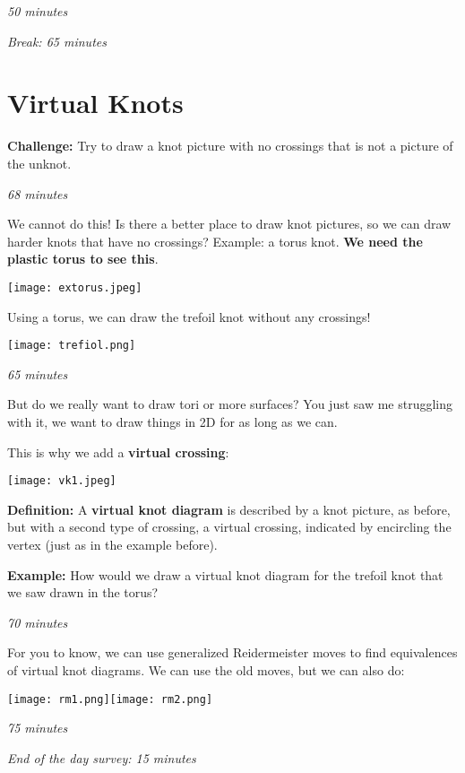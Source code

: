 \documentclass[12pt,letterpaper]{article}
\begin{document}
	\textit{50 minutes}
	
	\textit{Break: 65 minutes}
	
	\section{Virtual Knots}
	
	\textbf{Challenge:} Try to draw a knot picture with no crossings that is not a picture of the unknot.
	
	\textit{68 minutes}
	
	We cannot do this! Is there a better place to draw knot pictures, so we can draw harder knots that have no crossings? Example: a torus knot. \textbf{We need the plastic torus to see this}.
	
	\hspace{1cm}\texttt{[image: extorus.jpeg]}
	
	Using a torus, we can draw the trefoil knot without any crossings!
	
	\texttt{[image: trefiol.png]}
	
	\textit{65 minutes}
	
	But do we really want to draw tori or more surfaces? You just saw me struggling with it, we want to draw things in 2D for as long as we can.
	
    This is why we add a \textbf{virtual crossing}:
    
    \texttt{[image: vk1.jpeg]}
    
	\textbf{Definition:} A \textbf{virtual knot diagram} is described by a knot picture, as before, but with a second type of crossing, a virtual crossing, indicated by encircling the vertex (just as in the example before).
	
	\textbf{Example:}
	How would we draw a virtual knot diagram for the trefoil knot that we saw drawn in the torus?
	
	\textit{70 minutes}
	
	For you to know, we can use generalized Reidermeister moves to find equivalences of virtual knot diagrams. We can use the old moves, but we can also do:
	
	\texttt{[image: rm1.png]}\hspace{1cm}\texttt{[image: rm2.png]}
	
	\textit{75 minutes}
	
	\textit{End of the day survey: 15 minutes}
\end{document}
